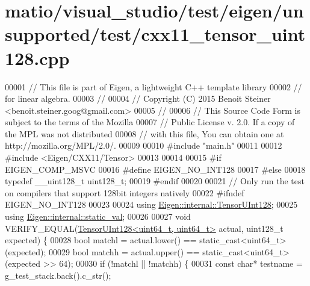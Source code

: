 \hypertarget{matio_2visual__studio_2test_2eigen_2unsupported_2test_2cxx11__tensor__uint128_8cpp_source}{}\section{matio/visual\+\_\+studio/test/eigen/unsupported/test/cxx11\+\_\+tensor\+\_\+uint128.cpp}
\label{matio_2visual__studio_2test_2eigen_2unsupported_2test_2cxx11__tensor__uint128_8cpp_source}

\begin{DoxyCode}
00001 \textcolor{comment}{// This file is part of Eigen, a lightweight C++ template library}
00002 \textcolor{comment}{// for linear algebra.}
00003 \textcolor{comment}{//}
00004 \textcolor{comment}{// Copyright (C) 2015 Benoit Steiner <benoit.steiner.goog@gmail.com>}
00005 \textcolor{comment}{//}
00006 \textcolor{comment}{// This Source Code Form is subject to the terms of the Mozilla}
00007 \textcolor{comment}{// Public License v. 2.0. If a copy of the MPL was not distributed}
00008 \textcolor{comment}{// with this file, You can obtain one at http://mozilla.org/MPL/2.0/.}
00009 
00010 \textcolor{preprocessor}{#include "main.h"}
00011 
00012 \textcolor{preprocessor}{#include <Eigen/CXX11/Tensor>}
00013 
00014 
00015 \textcolor{preprocessor}{#if EIGEN\_COMP\_MSVC}
00016 \textcolor{preprocessor}{#define EIGEN\_NO\_INT128}
00017 \textcolor{preprocessor}{#else}
00018 \textcolor{keyword}{typedef} \_\_uint128\_t uint128\_t;
00019 \textcolor{preprocessor}{#endif}
00020 
00021 \textcolor{comment}{// Only run the test on compilers that support 128bit integers natively}
00022 \textcolor{preprocessor}{#ifndef EIGEN\_NO\_INT128}
00023 
00024 \textcolor{keyword}{using} \hyperlink{struct_eigen_1_1internal_1_1_tensor_u_int128}{Eigen::internal::TensorUInt128};
00025 \textcolor{keyword}{using} \hyperlink{struct_eigen_1_1internal_1_1static__val}{Eigen::internal::static\_val};
00026 
00027 \textcolor{keywordtype}{void} VERIFY\_EQUAL(\hyperlink{struct_eigen_1_1internal_1_1_tensor_u_int128}{TensorUInt128<uint64\_t, uint64\_t>} actual, uint128\_t 
      expected) \{
00028   \textcolor{keywordtype}{bool} matchl = actual.lower() == \textcolor{keyword}{static\_cast<}uint64\_t\textcolor{keyword}{>}(expected);
00029   \textcolor{keywordtype}{bool} matchh = actual.upper() == \textcolor{keyword}{static\_cast<}uint64\_t\textcolor{keyword}{>}(expected >> 64);
00030   \textcolor{keywordflow}{if} (!matchl || !matchh) \{
00031     \textcolor{keyword}{const} \textcolor{keywordtype}{char}* testname = g\_test\_stack.back().c\_str();

\end{DoxyCode}

